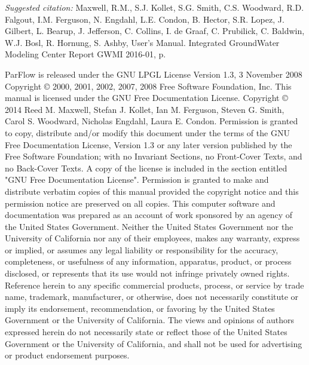 \begin{CopyrightPage}
{\em Suggested citation: }Maxwell, R.M., S.J. Kollet, S.G. Smith, C.S. Woodward, R.D. Falgout, I.M. Ferguson, N. Engdahl, L.E. Condon, B. Hector, S.R. Lopez, J. Gilbert, L. Bearup, J. Jefferson, C. Collins, I. de Graaf, C. Prubilick, C. Baldwin, W.J. Bosl, R. Hornung, S. Ashby, \parflow{} User's Manual. Integrated GroundWater Modeling Center Report GWMI 2016-01, \pageref{end}p.\newline

{ \scriptsize
\noindent ParFlow is released under the GNU LPGL License \newline
\noindent Version 1.3, 3 November 2008 \newline
\noindent Copyright \copyright{} 2000, 2001, 2002, 2007, 2008  Free Software Foundation, Inc.\newline
{}\newline
This manual is licensed under the GNU Free Documentation License.\newline%
Copyright \copyright{} 2014  Reed M. Maxwell, Stefan J. Kollet, Ian M. Ferguson, Steven G. Smith, Carol S. Woodward, Nicholas Engdahl, Laura E. Condon. 
Permission is granted to copy, distribute and/or modify this document
under the terms of the GNU Free Documentation License, Version 1.3
or any later version published by the Free Software Foundation; with no Invariant Sections, no Front-Cover Texts, and no Back-Cover Texts. A copy of the license is included in the section entitled "GNU Free Documentation License".
Permission is granted to make and distribute verbatim copies of this
manual provided the copyright notice and this permission notice are
preserved on all copies.\newline\vspace{0.1em}
This computer software and documentation was prepared as an account of
work sponsored by an agency of the United  States Government.  Neither
the United States Government nor the  University of California nor any
of their employees, makes any warranty, express or implied, or assumes
any legal liability  or responsibility for the accuracy, completeness,
or   usefulness of any   information,  apparatus, product, or  process
disclosed,   or represents that  its  use would not infringe privately
owned rights.  Reference  herein to any specific  commercial products,
process,   or service by   trade  name,  trademark,  manufacturer,  or
otherwise, does not  necessarily constitute or imply its  endorsement,
recommendation, or  favoring  by the  United  States Government or the
University of California.  The views and opinions of authors expressed
herein do not necessarily state or reflect those  of the United States
Government or the University of California, and shall  not be used for
advertising or product endorsement purposes.}
\end{CopyrightPage}

